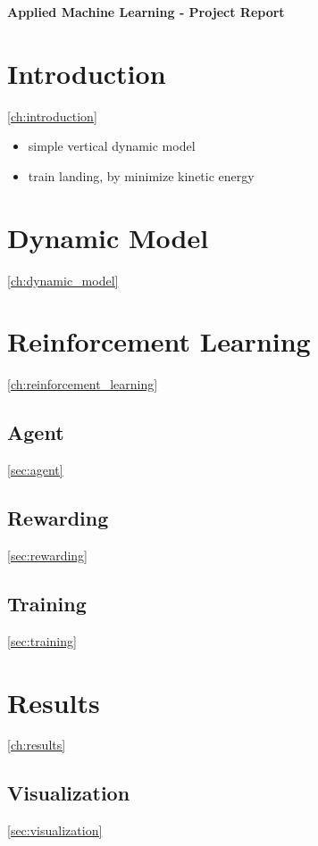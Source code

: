 \documentclass[10pt,a4paper]{article}
\begin{document}
\pagestyle{fancy}

\setlength\intextsep{5pt}
\setlength{\belowcaptionskip}{0pt}


\begin{tcolorbox}[boxrule=2pt, arc=0pt, colback=white, colframe=black]
\begin{center}
	\Large\textbf{Applied Machine Learning - Project Report}
\end{center}
\end{tcolorbox}


\chapter{Introduction}\ref{ch:introduction}
\begin{itemize}
	\item simple vertical dynamic model 
	\item train landing, by minimize kinetic energy
\end{itemize}


\chapter{Dynamic Model}\ref{ch:dynamic_model}


\chapter{Reinforcement Learning}\ref{ch:reinforcement_learning}

\section{Agent}\ref{sec:agent}

\section{Rewarding}\ref{sec:rewarding}

\section{Training}\ref{sec:training}


\chapter{Results}\ref{ch:results}

\section{Visualization}\ref{sec:visualization}
\end{document}
